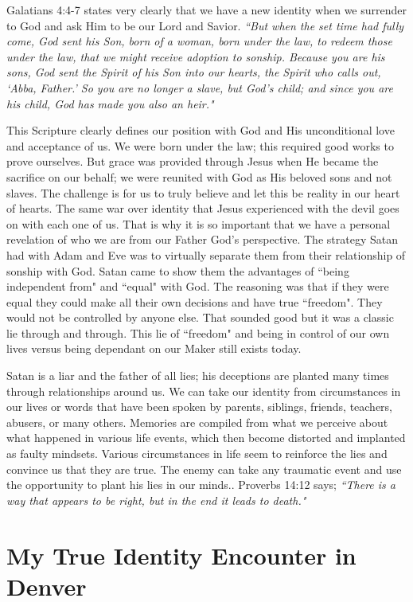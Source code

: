 \documentclass[oneside]{book}
\begin{document}
Galatians 4:4-7 states very clearly that we have a new identity when we surrender to God and ask Him to be our Lord and Savior. \textit{``But when the set time had fully come, God sent his Son, born of a woman, born under the law, to redeem those under the law, that we might receive adoption to sonship. Because you are his sons, God sent the Spirit of his Son into our hearts, the Spirit who calls out, `Abba, Father.' So you are no longer a slave, but God's child; and since you are his child, God has made you also an heir."}

This Scripture clearly defines our position with God and His unconditional love and acceptance of us. We were born under the law; this required good works to prove ourselves. But grace was provided through Jesus when He became the sacrifice on our behalf; we were reunited with God as His beloved sons and not slaves. The challenge is for us to truly believe and let this be reality in our heart of hearts. The same war over identity that Jesus experienced with the devil goes on with each one of us. That is why it is so important that we have a personal revelation of who we are from our Father God's perspective. The strategy Satan had with Adam and Eve was to virtually separate them from their relationship of sonship with God. Satan came to show them the advantages of ``being independent from" and ``equal" with God. The reasoning was that if they were equal they could make all their own decisions and have true ``freedom". They would not be controlled by anyone else. That sounded good but it was a classic lie through and through. This lie of ``freedom" and being in control of our own lives versus being dependant on our Maker still exists today. 

Satan is a liar and the father of all lies; his deceptions are planted many times through relationships around us. We can take our identity from circumstances in our lives or words that have been spoken by parents, siblings, friends, teachers, abusers, or many others. Memories are compiled from what we perceive about what happened in various life events, which then become distorted and implanted as faulty mindsets. Various circumstances in life seem to reinforce the lies and convince us that they are true. The enemy can take any traumatic event and use the opportunity to plant his lies in our minds.. Proverbs 14:12 says; \textit{``There is a way that appears to be right, but in the end it leads to death."}


\section{My True Identity Encounter in Denver}
\
\end{document}
